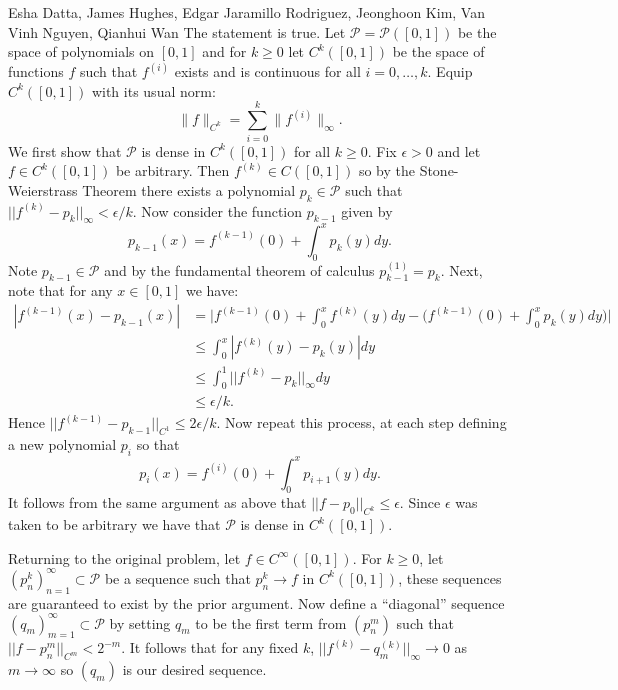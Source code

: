 
\begin{solution}{Esha Datta, James Hughes, Edgar Jaramillo Rodriguez, Jeonghoon Kim, Van Vinh Nguyen, Qianhui Wan}
        The statement is true.
        Let $\mathcal P = \mathcal P([0,1])$ be the space of polynomials on $[0,1]$ and for $k\geq 0$ let $C^k([0,1])$ be the space of functions $f$ such that $f^{(i)}$ exists and is continuous for all $i= 0,\ldots, k$.
        Equip $C^k([0,1])$ with its usual norm:
        \[ \lVert f \rVert_{C^k} = \sum_{i=0}^k \lVert f^{(i)}\rVert_{\infty}. \]
        We first show that $\mathcal P$ is dense in $C^k([0,1])$ for all $k \geq 0$.
        Fix $\epsilon >0$ and let $f \in C^k([0,1])$ be arbitrary.
        Then $f^{(k)} \in C([0,1])$ so by the Stone-Weierstrass Theorem there exists a polynomial $p_k \in \mathcal P$ such that $||f^{(k)} - p_k||_\infty < \epsilon/k$.
        Now consider the function $p_{k-1}$ given by
        \[ p_{k-1}(x) = f^{(k-1)}(0) + \int_0^x p_k(y) dy. \]
        Note $p_{k-1} \in \mathcal P$ and by the fundamental theorem of calculus $p_{k-1}^{(1)} = p_{k}$.
        Next, note that for any $x\in  [0,1]$ we have:
        \begin{align*}
            |f^{(k-1)}(x)- p_{k-1}(x)| 
            &= \Big|f^{(k-1)}(0) + \int_0^x f^{(k)}(y) dy - \Big( f^{(k-1)}(0) + \int_0^x p_k(y) dy \Big) \Big| \\
            &\leq \int_0^x |f^{(k)}(y) - p_k(y)| dy \\
            &\leq \int_0^1 ||f^{(k)} - p_k||_\infty dy \\
            &\leq \epsilon/k.
        \end{align*}
        Hence $||f^{(k-1)} - p_{k-1}||_{C^1} \leq 2\epsilon /k$. 
        Now repeat this process, at each step defining a new polynomial $p_i$ so that
        \[ p_i(x) = f^{(i)}(0)  + \int_0^x p_{i+1}(y)dy. \]
        It follows from the same argument as above that $||f - p_0||_{C^k} \leq \epsilon$.
        Since $\epsilon$ was taken to be arbitrary we have that $\mathcal P$ is dense in $C^k([0,1])$. 

        Returning to the original problem, let $f \in C^\infty([0,1])$.
        For $k \geq 0$, let $(p_n^k)_{n=1}^\infty \subset \mathcal P$ be a sequence such that $p_n^k \to f$ in $C^k([0,1])$, these sequences are guaranteed to exist by the prior argument.
        Now define a ``diagonal'' sequence $(q_m)_{m=1}^\infty \subset \mathcal P$ by setting $q_m$ to be the first term from $(p_n^m)$ such that $||f - p_n^m||_{C^m} < 2^{-m}$.
        It follows that for any fixed $k$, $||f^{(k)} - q_m^{(k)}||_\infty \to 0$ as $m\to \infty$ so $(q_m)$ is our desired sequence.
\end{solution}

